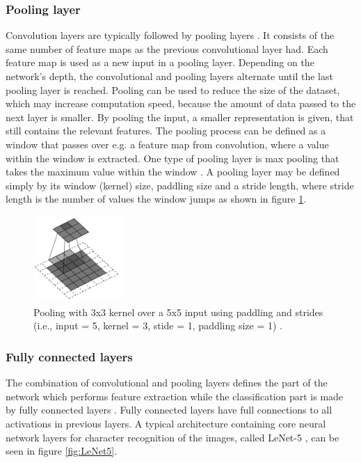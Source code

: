 \subsubsection{Pooling layer}  
Convolution layers are typically followed by pooling layers \citep{LeCun2015, Goodfellow2016}. It consists of the same number of feature maps as the previous convolutional layer had. Each feature map is used as a new input in a pooling layer. Depending on the network's depth, the convolutional and pooling layers alternate until the last pooling layer is reached.\citep{LeCun1998}
Pooling can be used to reduce the size of the dataset, which may increase computation speed, because the amount of data passed to the next layer is smaller. By pooling the input, a smaller representation is given, that still contains the relevant features.\citep{Goodfellow2016,LeCun1998}   
\noindent  
The pooling process can be defined as a window that passes over e.g. a feature map from convolution, where a value within the window is extracted. One type of pooling layer is max pooling that takes the maximum value within the window \citep{Goodfellow2016,Dumoulin2016}. A pooling layer may be defined simply by its window (kernel) size, paddling size and a stride length, where stride length is the number of values the window jumps as shown in figure \ref{fig:Kernel}.\citep{Dumoulin2016}

\begin{figure} [H]
\centering
\includegraphics[width=0.30\textwidth]{figures/Kernel}
\caption{Pooling with 3x3 kernel over a 5x5 input using paddling and strides (i.e., input = 5, kernel = 3, stide = 1, paddling size = 1) \citep{Dumoulin2016}.}
\label{fig:Kernel}  
\end{figure}

\subsubsection{Fully connected layers}
The combination of convolutional and pooling layers defines the part of the network which performs feature extraction while the classification part is made by fully connected layers \citep{Goodfellow2016}. Fully connected layers have full connections to all activations in previous layers. 
A typical architecture containing core neural network layers for character recognition of the images, called LeNet-5 \citep{LeCun1998}, can be seen in figure \ref{fig:LeNet5}.

